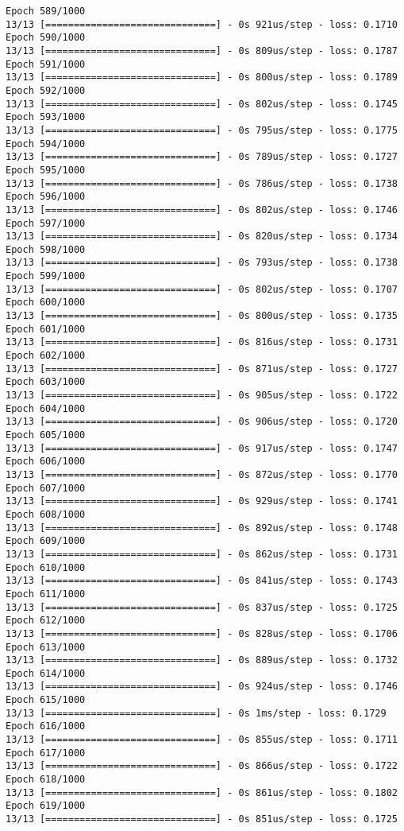 \documentclass[11pt]{article}
\begin{document}
\begin{Verbatim}[commandchars=\\\{\}]
Epoch 589/1000
13/13 [==============================] - 0s 921us/step - loss: 0.1710
Epoch 590/1000
13/13 [==============================] - 0s 809us/step - loss: 0.1787
Epoch 591/1000
13/13 [==============================] - 0s 800us/step - loss: 0.1789
Epoch 592/1000
13/13 [==============================] - 0s 802us/step - loss: 0.1745
Epoch 593/1000
13/13 [==============================] - 0s 795us/step - loss: 0.1775
Epoch 594/1000
13/13 [==============================] - 0s 789us/step - loss: 0.1727
Epoch 595/1000
13/13 [==============================] - 0s 786us/step - loss: 0.1738
Epoch 596/1000
13/13 [==============================] - 0s 802us/step - loss: 0.1746
Epoch 597/1000
13/13 [==============================] - 0s 820us/step - loss: 0.1734
Epoch 598/1000
13/13 [==============================] - 0s 793us/step - loss: 0.1738
Epoch 599/1000
13/13 [==============================] - 0s 802us/step - loss: 0.1707
Epoch 600/1000
13/13 [==============================] - 0s 800us/step - loss: 0.1735
Epoch 601/1000
13/13 [==============================] - 0s 816us/step - loss: 0.1731
Epoch 602/1000
13/13 [==============================] - 0s 871us/step - loss: 0.1727
Epoch 603/1000
13/13 [==============================] - 0s 905us/step - loss: 0.1722
Epoch 604/1000
13/13 [==============================] - 0s 906us/step - loss: 0.1720
Epoch 605/1000
13/13 [==============================] - 0s 917us/step - loss: 0.1747
Epoch 606/1000
13/13 [==============================] - 0s 872us/step - loss: 0.1770
Epoch 607/1000
13/13 [==============================] - 0s 929us/step - loss: 0.1741
Epoch 608/1000
13/13 [==============================] - 0s 892us/step - loss: 0.1748
Epoch 609/1000
13/13 [==============================] - 0s 862us/step - loss: 0.1731
Epoch 610/1000
13/13 [==============================] - 0s 841us/step - loss: 0.1743
Epoch 611/1000
13/13 [==============================] - 0s 837us/step - loss: 0.1725
Epoch 612/1000
13/13 [==============================] - 0s 828us/step - loss: 0.1706
Epoch 613/1000
13/13 [==============================] - 0s 889us/step - loss: 0.1732
Epoch 614/1000
13/13 [==============================] - 0s 924us/step - loss: 0.1746
Epoch 615/1000
13/13 [==============================] - 0s 1ms/step - loss: 0.1729
Epoch 616/1000
13/13 [==============================] - 0s 855us/step - loss: 0.1711
Epoch 617/1000
13/13 [==============================] - 0s 866us/step - loss: 0.1722
Epoch 618/1000
13/13 [==============================] - 0s 861us/step - loss: 0.1802
Epoch 619/1000
13/13 [==============================] - 0s 851us/step - loss: 0.1725

\end{Verbatim}
\end{document}

